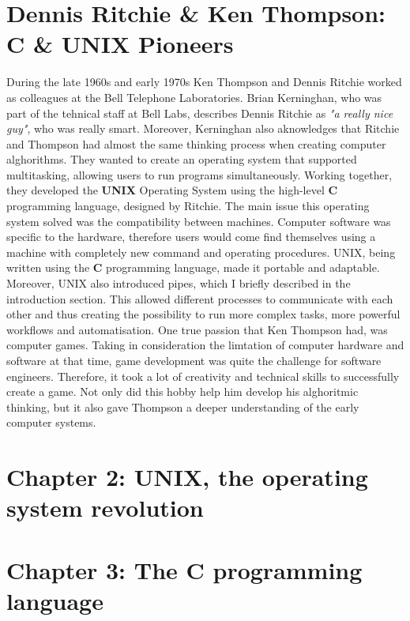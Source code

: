 \documentclass[12pt]{article}
\begin{document}
\section{Dennis Ritchie \& Ken Thompson: C \& UNIX Pioneers}
During the late 1960s and early 1970s Ken Thompson and Dennis Ritchie worked as colleagues at the Bell Telephone Laboratories. Brian Kerninghan, who was part of the tehnical
staff at Bell Labs, describes Dennis Ritchie as \textit{"a really nice
    guy"}, who was really smart. Moreover, Kerninghan also aknowledges that Ritchie and Thompson had almost the same thinking process when creating computer alghorithms.
They wanted to create an operating system that supported multitasking, allowing users to run programs simultaneously. \newline\newline
Working together, they developed the \textbf{UNIX} Operating System using the high-level \textbf{C} programming language, designed by Ritchie.
The main issue this operating system solved was the compatibility between machines.
Computer software was specific to the hardware, therefore users would come find themselves using a machine with completely new command and operating procedures.
UNIX, being written using the \textbf{C} programming language, made it portable and adaptable. Moreover, UNIX also introduced pipes, which I briefly described in the introduction section.
This allowed different processes to communicate with each other and thus creating the possibility to run more complex tasks, more powerful workflows and automatisation. \newline\newline
One true passion that Ken Thompson had, was computer games. Taking in consideration the limtation of computer hardware and software at that time, game development was quite the challenge for software engineers.
Therefore, it took a lot of creativity and technical skills to successfully create a game. Not only did this hobby help him develop his alghoritmic thinking, but it also gave Thompson a deeper understanding of the early
computer systems.\newline\newline
\newpage
\section{Chapter 2: UNIX, the operating system revolution}

\newpage
\section{Chapter 3: The C programming language}
\end{document}

